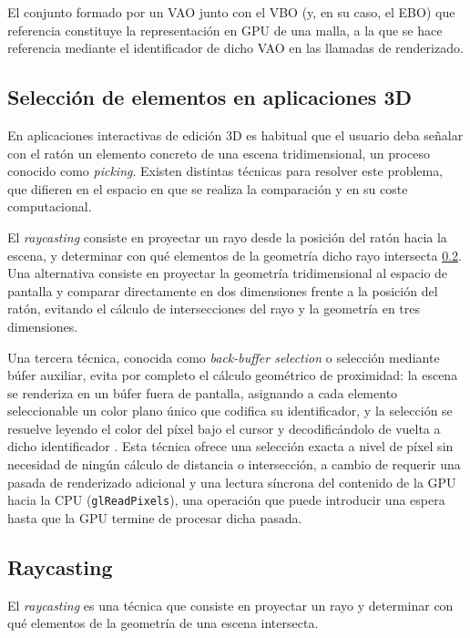 El conjunto formado por un VAO junto con el VBO (y, en su caso, el EBO) que referencia constituye la representación en GPU de una malla, a la que se hace referencia mediante el identificador de dicho VAO en las llamadas de renderizado.

\subsection{Selección de elementos en aplicaciones 3D}

En aplicaciones interactivas de edición 3D es habitual que el usuario deba señalar con el ratón un elemento concreto de una escena tridimensional, un proceso conocido como \emph{picking}. Existen distintas técnicas para resolver este problema, que difieren en el espacio en que se realiza la comparación y en su coste computacional.

El \emph{raycasting} consiste en proyectar un rayo desde la posición del ratón hacia la escena, y determinar con qué elementos de la geometría dicho rayo intersecta \ref{raycasting}. Una alternativa consiste en proyectar la geometría tridimensional al espacio de pantalla y comparar directamente en dos dimensiones frente a la posición del ratón, evitando el cálculo de intersecciones del rayo y la geometría en tres dimensiones.

Una tercera técnica, conocida como \emph{back-buffer selection} o selección mediante búfer auxiliar, evita por completo el cálculo geométrico de proximidad: la escena se renderiza en un búfer fuera de pantalla, asignando a cada elemento seleccionable un color plano único que codifica su identificador, y la selección se resuelve leyendo el color del píxel bajo el cursor y decodificándolo de vuelta a dicho identificador \cite{3dkingdoms-selection}. Esta técnica ofrece una selección exacta a nivel de píxel sin necesidad de ningún cálculo de distancia o intersección, a cambio de requerir una pasada de renderizado adicional y una lectura síncrona del contenido de la GPU hacia la CPU (\texttt{glReadPixels}), una operación que puede introducir una espera hasta que la GPU termine de procesar dicha pasada.

\subsection{Raycasting} \label{raycasting}

El \emph{raycasting} es una técnica que consiste en proyectar un rayo y determinar con qué elementos de la geometría de una escena intersecta.

